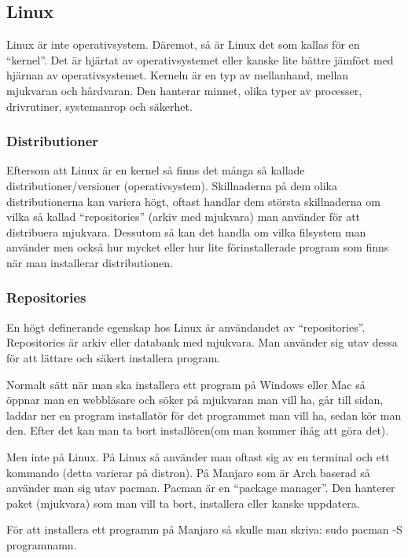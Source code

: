 \documentclass[12pt, a4paper]{report}
\begin{document}
    \subsection{Linux}
 
   Linux är inte operativsystem. Däremot, så är Linux det som kallas för en ``kernel''\cite{redhat}. Det är hjärtat av operativsystemet eller kanske lite bättre jämfört med hjärnan av operativsystemet. Kerneln är en typ av mellanhand, mellan mjukvaran och hårdvaran. Den hanterar minnet, olika typer av processer, drivrutiner, systemanrop och säkerhet\cite{redhat}.
 

    \subsubsection{Distributioner}

   Eftersom att Linux är en kernel så finns det många så kallade distributioner/versioner (operativsystem). Skillnaderna på dem olika distributionerna kan variera högt, oftast handlar dem största skillnaderna om vilka så kallad ``repositories'' (arkiv med mjukvara) man använder för att distribuera mjukvara. Dessutom så kan det handla om vilka filsystem man använder men också hur mycket eller hur lite förinstallerade program som finns när man installerar distributionen.

   \subsubsection{Repositories}

    En högt definerande egenskap hos Linux är användandet av ``repositories''. Repositories är arkiv eller databank med mjukvara. Man använder sig utav dessa för att lättare och säkert installera program.

    Normalt sätt när man ska installera ett program på Windows eller Mac så öppnar man en webbläsare och söker på mjukvaran man vill ha, går till sidan, laddar ner en program installatör för det programmet man vill ha, sedan kör man den. Efter det kan man ta bort installören(om man kommer ihåg att göra det).
    
    Men inte på Linux. På Linux så använder man oftast sig av en terminal och ett kommando (detta varierar på distron).
    På Manjaro som är Arch baserad så använder man sig utav pacman\cite{pacman}. Pacman är en ``package manager''\cite{pkgmanager}. Den hanterer paket (mjukvara) som man vill ta bort, installera eller kanske uppdatera.

    För att installera ett programm på Manjaro så skulle man skriva: sudo pacman -S programnamn. 
\end{document}

